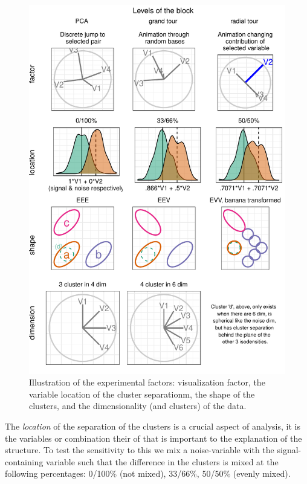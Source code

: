 \documentclass{template/monashthesis}
\begin{document}
\begin{figure}

{\centering \includegraphics[width=1\linewidth,]{./figures_from_script/ch4_fig2_exp_factors} 

}

\caption{Illustration of the experimental factors: visualization factor, the variable location of the cluster separationm, the shape of the clusters, and the dimensionality (and clusters) of the data.}\label{fig:ch4fig2}
\end{figure}

The \emph{location} of the separation of the clusters is a crucial aspect of analysis, it is the variables or combination their of that is important to the explanation of the structure. To test the sensitivity to this we mix a noise-variable with the signal-containing variable such that the difference in the clusters is mixed at the following percentages: 0/100\% (not mixed), 33/66\%, 50/50\% (evenly mixed).
\end{document}
